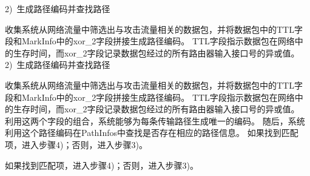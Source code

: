 2)~生成路径编码并查找路径\par
收集系统从网络流量中筛选出与攻击流量相关的数据包，并将数据包中的TTL字段和MarkInfo中的xor\_2字段拼接生成路径编码。
TTL字段指示数据包在网络中的生存时间，而xor\_2字段记录数据包经过的所有路由器输入接口号的异或值。
2)~生成路径编码并查找路径\par
收集系统从网络流量中筛选出与攻击流量相关的数据包，并将数据包中的TTL字段和MarkInfo中的xor\_2字段拼接生成路径编码。
TTL字段指示数据包在网络中的生存时间，而xor\_2字段记录数据包经过的所有路由器输入接口号的异或值。
利用这两个字段的组合，系统能够为每条传输路径生成唯一的编码。
随后，系统利用这个路径编码在PathInfos中查找是否存在相应的路径信息。
如果找到匹配项，进入步骤4)；否则，进入步骤3)。\par
如果找到匹配项，进入步骤4)；否则，进入步骤3)。\par

